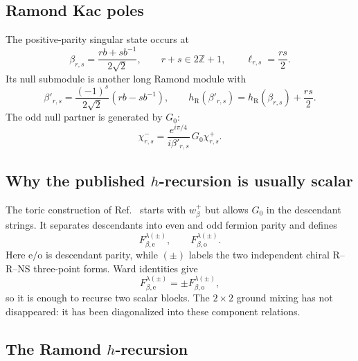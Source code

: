 \documentclass[11pt]{article}
\newcommand{\R}{\mathrm{R}}
\begin{document}
\subsection{Ramond Kac poles}

The positive-parity singular state occurs at
\begin{equation}
 \beta_{r,s}
 =
 \frac{rb+s b^{-1}}{2\sqrt2},
 \qquad r+s\in2\mathbb Z+1,
 \qquad \ell_{r,s}=\frac{rs}{2}.
 \label{eq:r-kac-momentum}
\end{equation}
Its null submodule is another long Ramond module with
\begin{equation}
 \beta'_{r,s}
 =
 \frac{(-1)^s}{2\sqrt2}
 \left(rb-sb^{-1}\right),
 \qquad
 h_\R(\beta'_{r,s})
 =
 h_\R(\beta_{r,s})+\frac{rs}{2}.
 \label{eq:r-shifted-momentum}
\end{equation}
The odd null partner is generated by \(G_0\):
\begin{equation}
 \chi^-_{r,s}
 =
 \frac{e^{i\pi/4}}{i\beta'_{r,s}}\,
 G_0\chi^+_{r,s}.
 \label{eq:r-null-partner}
\end{equation}

\subsection{\texorpdfstring{Why the published \(h\)-recursion is usually
scalar}{Why the published h-recursion is usually scalar}}

The toric construction of
Ref.~\cite{HadaszJaskolskiSuchanek2012Toric} starts with \(w_\beta^+\) but
allows \(G_0\) in the descendant strings.  It separates descendants into
even and odd fermion parity and defines
\begin{equation}
 F_{\beta,\mathrm e}^{\lambda(\pm)},\qquad
 F_{\beta,\mathrm o}^{\lambda(\pm)}.
\end{equation}
Here \(\mathrm e/\mathrm o\) is descendant parity, while \((\pm)\) labels
the two independent chiral R--R--NS three-point forms.  Ward identities give
\begin{equation}
 F_{\beta,\mathrm e}^{\lambda(\pm)}
 =
 \pm F_{\beta,\mathrm o}^{\lambda(\pm)},
 \label{eq:r-even-odd-relation}
\end{equation}
so it is enough to recurse two scalar blocks.  The \(2\times2\) ground
mixing has not disappeared: it has been diagonalized into these component
relations.

\subsection{\texorpdfstring{The Ramond \(h\)-recursion}
{The Ramond h-recursion}}
\end{document}
